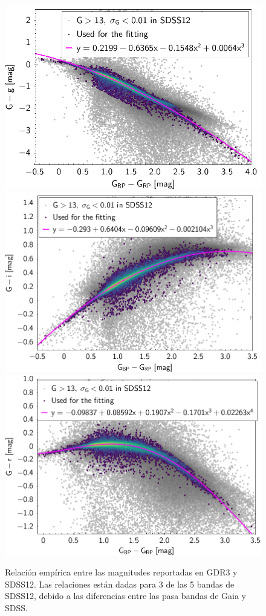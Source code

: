 \begin{figure}[!ht]
	\centering
	\includegraphics[scale=0.23]{Muestra/Secciones/Figures/Gaia-SDSS-Transform-g.png}
	\includegraphics[scale=0.23]{Muestra/Secciones/Figures/Gaia-SDSS-Transform-i.png}
	\includegraphics[scale=0.23]{Muestra/Secciones/Figures/Gaia-SDSS-Transform-r.png}

	\caption{Relación empírica entre las magnitudes reportadas en GDR3 y SDSS12.
	Las relaciones están dadas para 3 de las 5 bandas de SDSS12, debido a las
	diferencias entre las pasa bandas de Gaia y SDSS.
	}
	\label{gdr3SdssConversionGraphs}
\end{figure}

